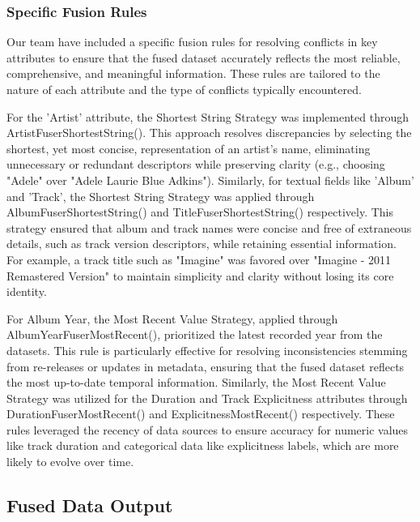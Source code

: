 \documentclass[runningheads]{llncs}
\begin{document}
\subsubsection{Specific Fusion Rules}
Our team have included a specific fusion rules for resolving conflicts in key attributes to ensure that the fused dataset accurately reflects the most reliable, comprehensive, and meaningful information. These rules are tailored to the nature of each attribute and the type of conflicts typically encountered.

For the 'Artist' attribute, the Shortest String Strategy was implemented through ArtistFuserShortestString(). This approach resolves discrepancies by selecting the shortest, yet most concise, representation of an artist's name, eliminating unnecessary or redundant descriptors while preserving clarity (e.g., choosing "Adele" over "Adele Laurie Blue Adkins").
Similarly, for textual fields like 'Album' and 'Track', the Shortest String Strategy was applied through AlbumFuserShortestString() and TitleFuserShortestString() respectively. This strategy ensured that album and track names were concise and free of extraneous details, such as track version descriptors, while retaining essential information. For example, a track title such as "Imagine" was favored over "Imagine - 2011 Remastered Version" to maintain simplicity and clarity without losing its core identity.

For Album Year, the Most Recent Value Strategy, applied through AlbumYearFuserMostRecent(), prioritized the latest recorded year from the datasets. This rule is particularly effective for resolving inconsistencies stemming from re-releases or updates in metadata, ensuring that the fused dataset reflects the most up-to-date temporal information. Similarly, the Most Recent Value Strategy was utilized for the Duration and Track Explicitness attributes through DurationFuserMostRecent() and ExplicitnessMostRecent() respectively. These rules leveraged the recency of data sources to ensure accuracy for numeric values like track duration and categorical data like explicitness labels, which are more likely to evolve over time.

\subsection{Fused Data Output}
\end{document}
